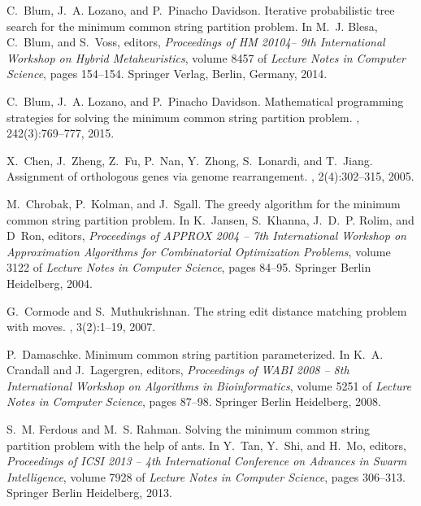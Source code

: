 \documentclass[11pt,a4paper]{article}
\begin{document}
\begin{thebibliography}{10}

C.~Blum, J.~A. Lozano, and P.~{Pinacho Davidson}.
\newblock Iterative probabilistic tree search for the minimum common string
  partition problem.
\newblock In M.~J. Blesa, C.~Blum, and S.~Voss, editors, {\em Proceedings of HM
  20104-- 9th International Workshop on Hybrid Metaheuristics}, volume 8457 of
  {\em Lecture Notes in Computer Science}, pages 154--154. Springer Verlag,
  Berlin, Germany, 2014.

C.~Blum, J.~A. Lozano, and P.~{Pinacho Davidson}.
\newblock Mathematical programming strategies for solving the minimum common
  string partition problem.
, 242(3):769--777,
  2015.

X.~Chen, J.~Zheng, Z.~Fu, P.~Nan, Y.~Zhong, S.~Lonardi, and T.~Jiang.
\newblock Assignment of orthologous genes via genome rearrangement.
,
  2(4):302--315, 2005.

M.~Chrobak, P.~Kolman, and J.~Sgall.
\newblock The greedy algorithm for the minimum common string partition problem.
\newblock In K.~Jansen, S.~Khanna, J.~D.~P. Rolim, and D~Ron, editors, {\em
  Proceedings of APPROX 2004 -- 7th International Workshop on Approximation
  Algorithms for Combinatorial Optimization Problems}, volume 3122 of {\em
  Lecture Notes in Computer Science}, pages 84--95. Springer Berlin Heidelberg,
  2004.

G.~Cormode and S.~Muthukrishnan.
\newblock The string edit distance matching problem with moves.
, 3(2):1--19, 2007.

P.~Damaschke.
\newblock Minimum common string partition parameterized.
\newblock In K.~A. Crandall and J.~Lagergren, editors, {\em Proceedings of WABI
  2008 -- 8th International Workshop on Algorithms in Bioinformatics}, volume
  5251 of {\em Lecture Notes in Computer Science}, pages 87--98. Springer
  Berlin Heidelberg, 2008.

S.~M. Ferdous and M.~S. Rahman.
\newblock Solving the minimum common string partition problem with the help of
  ants.
\newblock In Y.~Tan, Y.~Shi, and H.~Mo, editors, {\em Proceedings of ICSI 2013
  -- 4th International Conference on Advances in Swarm Intelligence}, volume
  7928 of {\em Lecture Notes in Computer Science}, pages 306--313. Springer
  Berlin Heidelberg, 2013.


\end{thebibliography}
\end{document}
